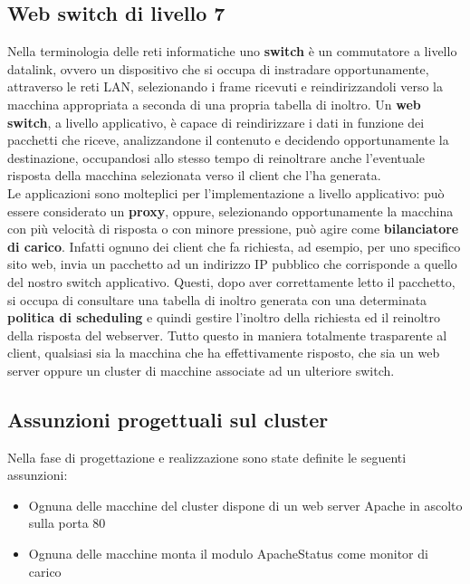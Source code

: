\documentclass[italian]{tktltiki2}
\begin{document}
\subsection{Web switch di livello 7}
Nella terminologia delle reti informatiche uno \textbf{switch} è un commutatore a livello datalink, ovvero un dispositivo che si occupa di instradare opportunamente, attraverso le reti LAN, selezionando i frame ricevuti e reindirizzandoli verso la macchina appropriata a seconda di una propria tabella di inoltro. Un \textbf{web switch}, a livello applicativo, è capace di reindirizzare i dati in funzione dei pacchetti che riceve, analizzandone il contenuto e decidendo opportunamente la destinazione, occupandosi allo stesso tempo di reinoltrare anche l'eventuale risposta della macchina selezionata verso il client che l'ha generata.
\\
Le applicazioni sono molteplici per l'implementazione a livello applicativo: può essere considerato un \textbf{proxy}, oppure, selezionando opportunamente la macchina con più velocità di risposta o con minore pressione, può agire come \textbf{bilanciatore di carico}. Infatti ognuno dei client che fa richiesta, ad esempio, per uno specifico sito web, invia un pacchetto ad un indirizzo IP pubblico che corrisponde a quello del nostro switch applicativo. Questi, dopo aver correttamente letto il pacchetto, si occupa di consultare una tabella di inoltro generata con una determinata \textbf{politica di scheduling} e quindi gestire l'inoltro della richiesta ed il reinoltro della risposta del webserver. Tutto questo in maniera totalmente trasparente al client, qualsiasi sia la macchina che ha effettivamente risposto, che sia un web server oppure un cluster di macchine associate ad un ulteriore switch.

\subsection{Assunzioni progettuali sul cluster}
Nella fase di progettazione e realizzazione sono state definite le seguenti assunzioni:
\begin{itemize}
  \item Ognuna delle macchine del cluster dispone di un web server Apache\cite{apache_server} in ascolto sulla porta 80
  \item Ognuna delle macchine monta il modulo ApacheStatus come monitor di carico
\end{itemize}
\end{document}
